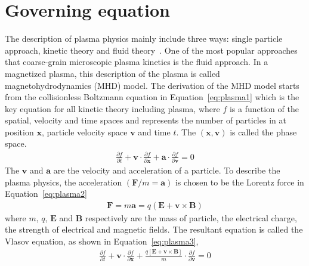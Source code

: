 \documentclass[runningheads]{llncs}
\begin{document}
\section{Governing equation} \label{sec:geq}
The description of plasma physics mainly include three ways: single particle approach, kinetic theory and fluid theory~\cite{dendy1995plasma}. One of the most popular approaches that coarse-grain microscopic plasma kinetics is the fluid approach. In a magnetized plasma, this description of the plasma is called magnetohydrodynamics (MHD) model. The derivation of the MHD model starts from the collisionless Boltzmann equation in Equation~\eqref{eq:plasma1} which is the key equation for all kinetic theory including plasma, where $f$ is a function of the spatial, velocity and time spaces and represents the number of particles in at position $\bm{x}$, particle velocity space $\bm{v}$ and time $t$. The $(\bm{x},\bm{v})$ is called the phase space.
\begin{eqnarray}
\frac{\partial f}{\partial t} + \bm{v}\cdot \frac{\partial f}{\partial \bm{x}}+\bm{a}\cdot\frac{\partial f}{\partial \bm{v}} = 0 \label{eq:plasma1}
\end{eqnarray}
The $\bm{v}$ and $\bm{a}$ are the velocity and acceleration of a particle. To describe the plasma physics, the acceleration $(\bm{F}/m = \bm{a})$ is chosen to be the Lorentz force in Equation~\eqref{eq:plasma2}
\begin{eqnarray}
\bm{F} = m\bm{a} = q(\bm{E}+\bm{v}\times\bm{B}) \label{eq:plasma2}
\end{eqnarray}
where $m$, $q$, $\bm{E}$ and $\bm{B}$ respectively are the mass of particle, the electrical charge, the strength of electrical and magnetic fields. The resultant equation is called the Vlasov equation, as shown in Equation~\eqref{eq:plasma3}, 
\begin{eqnarray}
\frac{\partial f}{\partial t} + \bm{v}\cdot \frac{\partial f}{\partial \bm{x}} + \frac{q[\bm{E}+\bm{v}\times \bm{B}]}{m}\cdot \frac{\partial f}{\partial \bm{v}} = 0\label{eq:plasma3}
\end{eqnarray} 
\end{document}
